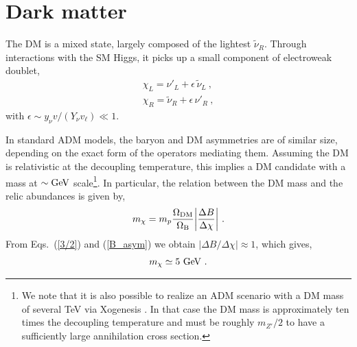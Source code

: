\documentclass[prd,showpcs,amsmath,amssymb,nofootinbib,preprintnumbers,balancelastpage,longbibliography,superscriptaddress,notitlepage]{revtex4}
\def\bea{\begin{eqnarray}}
\def\eea{\end{eqnarray}}
\def\bea{\begin{eqnarray}}
\def\eea{\end{eqnarray}}
\begin{document}
\section{Dark matter}
\label{DMsec}

The DM is a mixed state, largely composed of the lightest $\tilde{\nu}_R$.  Through interactions with the SM Higgs, it picks up a
small component of electroweak doublet,
\bea
\chi_L=\nu'_L + \epsilon \,\tilde\nu_L \ , \nonumber\\
\chi_R=\tilde\nu_R + \epsilon \,\nu'_R \ ,
\label{chi}
\eea
with  $\epsilon \sim y_\nu v / (Y_\nu v_\ell) \ll 1$. 

In standard ADM models, the baryon and DM asymmetries are of similar size, depending on the exact form of the operators mediating them. 
Assuming the DM is relativistic at the decoupling temperature, this implies a DM candidate with a mass at  $\sim {\rm GeV}$ 
scale\footnote{We note that it is also possible to realize an ADM scenario with a DM mass of several TeV via Xogenesis \cite{Buckley:2010ui}. 
In that case the DM mass is approximately ten times the decoupling temperature and must be roughly $m_{Z'}/2$ to have a sufficiently large annihilation cross section.}. 
In particular, the  relation between the DM mass and the relic abundances is given by,
\bea
m_\chi = m_{p} \frac{\Omega_{\rm DM}}{\Omega_{\rm B}}  \bigg|\frac{\Delta B}{\Delta \chi}\bigg|\ .
\label{m_X}
\eea
From Eqs.~(\ref{3/2}) and (\ref{B_asym}) we obtain $|\Delta B / \Delta \chi| \approx 1$, which gives,
\bea
m_\chi \simeq 5 \ \rm GeV \ .
\eea

\end{document}
